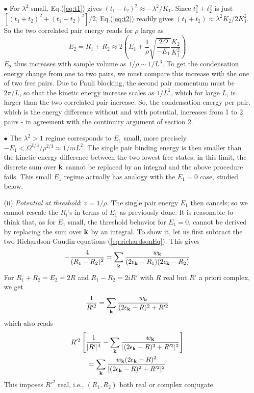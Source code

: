 \documentclass[5p,twocolumn]{elsarticle}
\begin{document}
$\bullet$ For $\lambda^{2}$ small, Eq.(\ref{eq:t1}) gives $(t_{1}-t_{2})^{2}\approx-\lambda^{2}/K_{1}$. Since $t_{1}^{2}+t_{2}^{2}$ is just $\left[(t_{1}+t_{2})^{2}+(t_{1}-t_{2})^{2}\right]/2$,  Eq.(\ref{eq:t2}) readily gives $(t_{1}+t_{2})\approx\lambda^{2}K_{2}/2K_{1}^{2}$.  So the two correlated pair energy  reads for $\rho$ large as 
\begin{equation}
E_{2}=R_{1}+R_{2}\approx2\left(E_{1}+\frac{1}{\rho}\sqrt{\frac{2\Omega}{-E_{1}}}\frac{K_{2}}{K_{1}^{2}}\right)
\end{equation}
$E_{2}$ thus increases with sample volume as $1/\rho\sim1/L^{3}$.
To get the condensation energy change from one to two pairs, we must compare this increase with the one of two free pairs.  Due to Pauli blocking, the second pair momentum must be $2\pi/L$, so that the kinetic energy increase scales as $1/L^{2}$, which for large $L$, is larger than the two correlated pair increase. 
So, the condensation energy per pair, which is the energy difference without and with potential, increases from 1 to 2 pairs - in agreement with the continuity argument of section 2. 

 $\bullet$ The $\lambda^{2}>1$ regime corresponds to $E_{1}$ small, more precisely $-E_{1}<\Omega^{1/3}/\rho^{2/3}\approx1/mL^{2}$.  The single pair binding energy is then smaller than the kinetic energy difference between the two lowest free states: in this limit, the discrete sum over $\mathbf{k}$ cannot be replaced by an integral and the above procedure fails.  This small $E_1$ regime  actually has analogy with the $E_1=0$ case, studied below. 


(ii) {\it Potential at threshold}: $v=1/\rho$. The single pair energy $E_1$ then cancels; so we cannot rescale the $R_i$'s in terms of $E_1$ as previously done. It is reasonable to think that, as for $E_1$ small, the threshold behavior for $E_1=0$, cannot be derived by replacing the sum over $\mathbf{k}$ by an integral.
To show it, let us first subtract the two Richardson-Gaudin equations (\ref{eq:richardsonEq}). This gives
\begin{equation}
-\frac{4}{(R_1-R_2)^2}=\sum_{\mathbf{k}}\frac{w_{\mathbf{k}}}{(2\epsilon_{\mathbf{k}}-R_1)(2\epsilon_{\mathbf{k}}-R_2)}\label{eq:2PairMinus}
\end{equation}
For $R_1+R_2=E_2=2R$ and $R_1-R_2=2iR'$ with $R$ real but $R'$ a priori complex, we get
\begin{equation}
\frac{1}{R'^2}=\sum_{\mathbf{k}}\frac{w_{\mathbf{k}}}{(2\epsilon_{\mathbf{k}}-R)^2+R'^2}
\end{equation}
which also reads 
\begin{multline}
R'^{2}\left[\frac{1}{|R'|^{4}}-\sum_{\mathbf{k}}\frac{w_{\mathbf{k}}}{|(2\epsilon_{\mathbf{k}}-R)^{2}+R'^{2}|^{2}}\right]\\
=\sum_{\mathbf{k}}\frac{w_{\mathbf{k}}(2\epsilon_{\mathbf{k}}-R)^{2}}{|(2\epsilon_{\mathbf{k}}-R)^{2}+R'^{2}|^{2}}
\end{multline}
This imposes $R'^2$ real, i.e., $(R_1,R_2)$ both real or complex conjugate.
\end{document}
